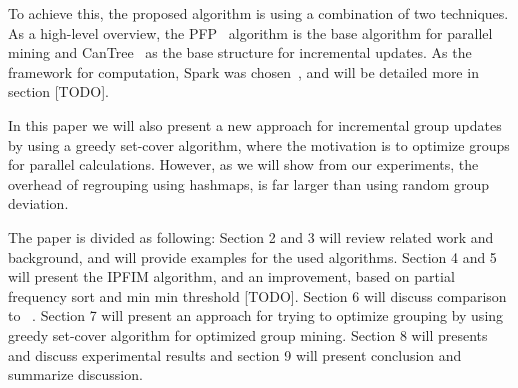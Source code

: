 To achieve this, the proposed algorithm is using a combination of two techniques. As a high-level overview, the PFP~\cite{li2008pfp} algorithm is the base algorithm for parallel mining and CanTree~\cite{leung2005cantree} as the base structure for incremental updates.  As the framework for computation, Spark was chosen~\cite{spark},  and will be detailed more in section [TODO]. 

\iffalse
It is important to mention that a similar approach was already developed by~\cite{song2017} at 2017, but was added as a reference after implementation and results, and we will discuss and compare to this paper in details in section [TODO]. 
\fi
In this paper we will also present a new approach for incremental group updates by using a greedy set-cover algorithm, where the motivation is to optimize groups for parallel calculations. However, as we will show from our experiments, the overhead of regrouping using hashmaps, is far larger than using random group deviation. 

The paper is divided as following: Section 2 and 3 will review related work and background, and will provide examples for the used algorithms. Section 4 and 5 will present the IPFIM algorithm, and an improvement, based on partial frequency sort and min min threshold  [TODO]. Section 6 will discuss comparison to ~\cite{song2017}.  Section 7 will present an approach for trying to optimize grouping by using greedy set-cover algorithm for optimized group mining. Section 8 will presents and discuss experimental results and section 9 will present conclusion and summarize discussion.
